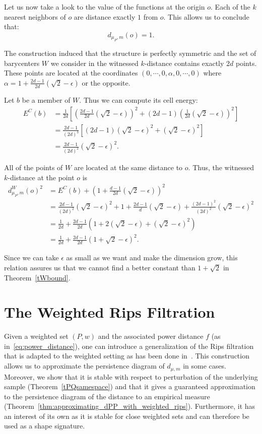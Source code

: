 \documentclass[a4paper]{article}
\newcommand\dm{d_{\mu,m}}
\newcommand\dmP{d_{\mu_P,m}}
\newcommand\dPW{d_{\mu_P,m}^W}
\begin{document}
Let us now take a look to the value of the functions at the origin $o$.
Each of the $k$ nearest neighbors of $o$ are distance exactly $1$ from $o$.
This allows us to conclude that: $$\dmP(o)=1.$$

The construction induced that the structure is perfectly symmetric and the set of barycenters $W$ we consider in the witnessed $k$-distance contains exactly $2d$ points.
These points are located at the coordinates $(0,\cdots,0,\alpha,0,\cdots,0)$ where $\alpha=1+\frac{2d-1}{2d}(\sqrt{2}-\epsilon)$ or the opposite. 

Let $b$ be a member of $W$.
Thus we can compute its cell energy: 
\begin{align*}
E^C(b)&=\frac{1}{2d}\left[\left(\frac{2d-1}{2d}(\sqrt{2}-\epsilon)\right)^2+(2d-1)\left(\frac{1}{2d}(\sqrt{2}-\epsilon)\right)^2\right]\\
&=\frac{2d-1}{(2d)^3}\left[(2d-1)(\sqrt{2}-\epsilon)^2+(\sqrt{2}-\epsilon)^2\right]\\
&=\frac{2d-1}{(2d)^2}(\sqrt{2}-\epsilon)^2.
\end{align*}

All of the points of $W$ are located at the same distance to $o$.
Thus, the witnessed $k$-distance at the point $o$ is
\begin{align*}
  \dPW(o)^2
    &=E^C(b)+\left(1+\frac{d-1}{2d}(\sqrt{2}-\epsilon)\right)^2\\
    &=\frac{2d-1}{(2d)^2}(\sqrt{2} - \epsilon)^2+1+\frac{2d-1}{d}(\sqrt{2} - \epsilon)+\frac{(2d-1)^2}{(2d)^2}(\sqrt{2}-\epsilon)^2\\
    &=\frac{1}{2d}+\frac{2d-1}{2d}\left(1+2(\sqrt{2}-\epsilon)+(\sqrt{2}-\epsilon)^2\right)\\
    &=\frac{1}{2d}+\frac{2d-1}{2d}(1+\sqrt{2}-\epsilon)^2.
\end{align*}

Since we can take $\epsilon$ as small as we want and make the dimension grow, this relation assures us that we cannot find a better constant than $1+\sqrt{2}$ in Theorem~\ref{tWbound}.



\section{The Weighted Rips Filtration} \label{sWRips}

 Given a weighted set $(P,w)$ and the associated power distance $f$ (as in~\eqref{eq:power_distance}), one can introduce a generalization of the Rips filtration that is adapted to the weighted setting as has been done in~\cite{wkdGMM}.
  This construction allows us to approximate the persistence diagram of $\dm$ in some cases. 
  Moreover, we show that it is stable with respect to perturbation of the underlying sample (Theorem~\ref{tPQsamespace}) and that it gives a guaranteed approximation to the persistence diagram of the distance to an empirical measure (Theorem~\ref{thm:approximating_dPP_with_weighted_rips}). 
Furthermore, it has an interest of its own as it is stable for close weighted sets and can therefore be used as a shape signature.
\end{document}
